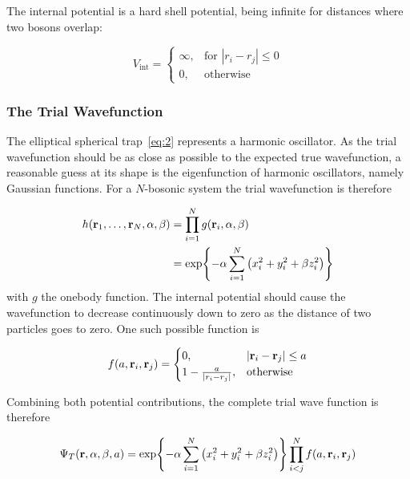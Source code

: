 The internal potential is a hard shell potential, being infinite for distances
where two bosons overlap:

\begin{equation*}
  V_{\text{int}} = \begin{cases}
    \infty, &\text{for } |r_{i} - r_{j}| \le 0\\
    0, &\text{otherwise}
    \end{cases}
\end{equation*}

\subsubsection{The Trial Wavefunction}

The elliptical spherical trap~\eqref{eq:2} represents a harmonic oscillator. As
the trial wavefunction should be as close as possible to the expected true
wavefunction, a reasonable guess at its shape is the eigenfunction of
harmonic oscillators, namely Gaussian functions. For a \(N\)-bosonic system the
trial wavefunction is therefore

\begin{align*}
  h(\vb{r}_{1}, \ldots, \vb{r}_{N}, \alpha, \beta) &= \prod_{i=1}^{N}g(\vb{r}_{i}, \alpha, \beta)\\
  &= \exp{-\alpha\sum_{i=1}^{N}\left( x_{i}^{2} + y_{i}^{2}+\beta z_{i}^{2} \right)}
\end{align*}
with \(g\) the onebody function.
The internal potential should cause the wavefunction to decrease continuously
down to zero as the distance of two particles goes to zero. One such possible
function is

\begin{equation*}
  f(a, \vb{r}_{i}, \vb{r}_{j}) = \begin{cases}
    0, &|\vb{r}_{i} - \vb{r}_{j}| \le a\\
    1 - \frac{a}{\abs{r_{i}-r_{j}}}, &\text{otherwise}
    \end{cases}
\end{equation*}

Combining both potential contributions, the complete trial wave function is
therefore

\begin{equation*}
  \Psi_{T}(\vb{r}, \alpha, \beta, a) = \exp{-\alpha\sum_{i=1}^{N}\left( x_{i}^{2} + y^{2}_{i} + \beta z^{2}_{i} \right)}
  \prod_{i<j}^{N}f(a, \vb{r}_{i}, \vb{r}_{j})
\end{equation*}

